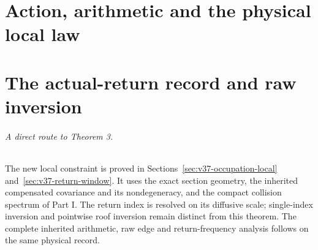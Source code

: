 \documentclass[11pt,reqno]{amsart}
\numberwithin{equation}{section}
\theoremstyle{definition}\newtheorem{definition}[theorem]{Definition}
\theoremstyle{remark}\newtheorem{remark}[theorem]{Remark}
\begin{document}
\part{Action, arithmetic and the physical local law}









\part{The actual-return record and raw inversion}
\paragraph{A direct route to Theorem 3.}
The new local constraint is proved in
Sections~\ref{sec:v37-occupation-local} and~\ref{sec:v37-return-window}.
It uses the exact section geometry, the inherited compensated
covariance and its nondegeneracy, and the compact collision spectrum
of Part I. The return index is resolved on its diffusive scale;
single-index inversion and pointwise roof inversion remain distinct
from this theorem. The complete inherited arithmetic, raw edge and
return-frequency analysis follows on the same physical record.

















\end{document}
